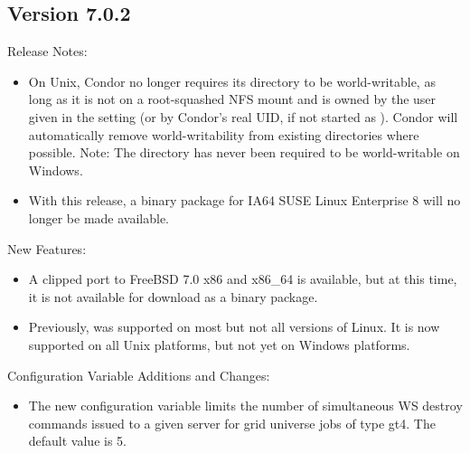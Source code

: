 \subsection*{\label{sec:New-7-0-2}Version 7.0.2}

\noindent Release Notes:

\begin{itemize}

\item On Unix, Condor no longer requires its  directory to
be world-writable, as long as it is not on a root-squashed NFS mount and is
owned by the user given in the  setting (or by Condor's
real UID, if not started as ). Condor will automatically remove
world-writability from existing  directories where possible.
Note: The  directory has never been required to be
world-writable on Windows.

\item With this release, a binary package for IA64 SUSE Linux Enterprise 8
will no longer be made available.

\end{itemize}


\noindent New Features:

\begin{itemize}

\item A clipped port to FreeBSD 7.0 x86 and x86\_64 is available, but at this
time, it is not available for download as a binary package.

\item Previously,   was supported on most
but not all versions of Linux.  It is now supported on all Unix platforms,
but not yet on Windows platforms.

\end{itemize}

\noindent Configuration Variable Additions and Changes:

\begin{itemize}

\item The new configuration variable
 limits the number
of simultaneous WS destroy commands issued to a given server for grid
universe jobs of type gt4. The default value is 5.

\end{itemize}

